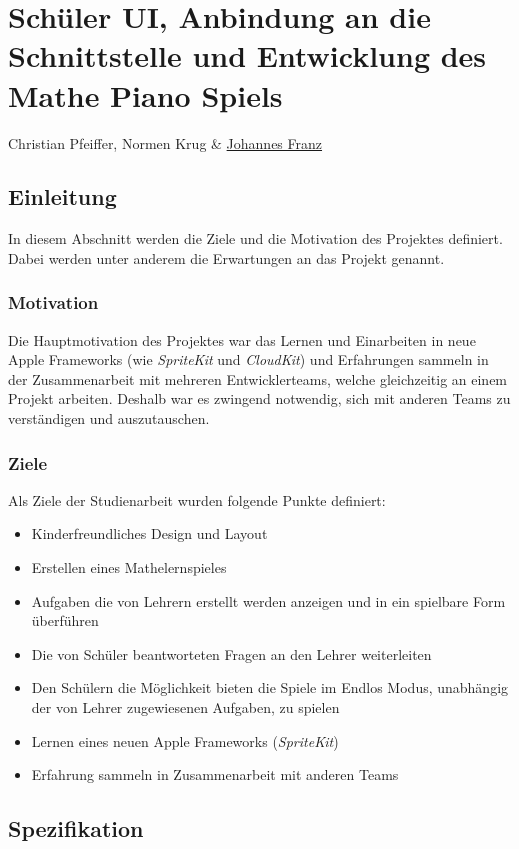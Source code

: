 

\chapter{Schüler UI, Anbindung an die Schnittstelle und Entwicklung des Mathe Piano Spiels}
Christian Pfeiffer, Normen Krug \& \href{mailto:jofranz90@gmail.com?subject=Swift-Studienarbeit}{Johannes Franz}


\section{Einleitung}
In diesem Abschnitt werden die Ziele und die Motivation des Projektes definiert. Dabei werden unter anderem die Erwartungen an das Projekt genannt.

\subsection{Motivation}
Die Hauptmotivation des Projektes war das Lernen und Einarbeiten in neue Apple Frameworks (wie \textit{SpriteKit} und \textit{CloudKit}) und Erfahrungen sammeln in der Zusammenarbeit mit mehreren Entwicklerteams, welche gleichzeitig an einem Projekt arbeiten. Deshalb war es zwingend notwendig, sich mit anderen Teams zu verständigen und auszutauschen.  

\subsection{Ziele}
Als Ziele der Studienarbeit wurden folgende Punkte definiert: 
\begin{itemize}
\item Kinderfreundliches Design und Layout
\item Erstellen eines Mathelernspieles 
\item Aufgaben die von Lehrern erstellt werden anzeigen und in ein spielbare Form überführen
\item Die von Schüler beantworteten Fragen an den Lehrer weiterleiten
\item Den Schülern die Möglichkeit bieten die Spiele im Endlos Modus, unabhängig der von Lehrer zugewiesenen Aufgaben, zu spielen
\item Lernen eines neuen Apple Frameworks (\textit{SpriteKit})
\item Erfahrung sammeln in Zusammenarbeit mit anderen Teams
\end{itemize}
\section{Spezifikation}


